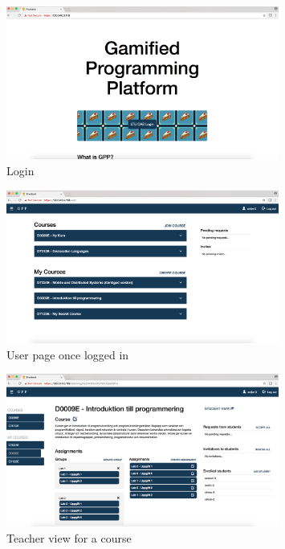 \begin{figure}[H]
\centering
\includegraphics[width=0.8\textwidth]{img/gppinpictures/login.png}
\caption{Login}
\label{fig:login}
\end{figure}

\begin{figure}[H]
\centering
\includegraphics[width=0.8\textwidth]{img/gppinpictures/user.png}
\caption{User page once logged in}
\label{fig:user}
\end{figure}

\begin{figure}[H]
\centering
\includegraphics[width=0.8\textwidth]{img/gppinpictures/teacher.png}
\caption{Teacher view for a course}
\label{fig:teacher}
\end{figure}

